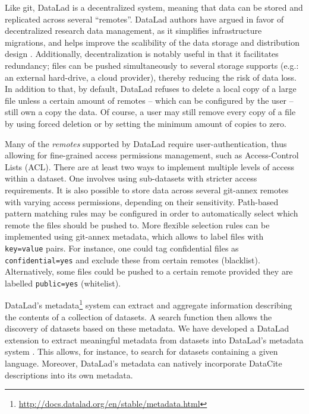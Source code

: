 \documentclass[smallextended]{svjour3}       %
\begin{document}
Like git, DataLad is a decentralized system, meaning that data can be stored and replicated across several ``remotes''. DataLad authors have argued in favor of decentralized research data management, as it simplifies infrastructure migrations, and helps improve the scalibility of the data storage and distribution design \cite{decentralization_hanke}. Additionally, decentralization is notably useful in that it facilitates redundancy; files can be pushed simultaneously to several storage supports (e.g.: an external hard-drive, a cloud provider), thereby reducing the risk of data loss. In addition to that, by default, DataLad refuses to delete a local copy of a large file unless a certain amount of remotes -- which can be configured by the user -- still own a copy the data. Of course, a user may still remove every copy of a file by using forced deletion or by setting the minimum amount of copies to zero.

Many of the \emph{remotes} supported by DataLad require user-authentication, thus allowing for fine-grained access permissions management, such as Access-Control Lists (ACL). There are at least two ways to implement multiple levels of access within a dataset. One involves using sub-datasets with stricter access requirements. It is also possible to store data across several git-annex remotes with varying access permissions, depending on their sensitivity. Path-based pattern matching rules may be configured in order to automatically select which remote the files should be pushed to. More flexible selection rules can be implemented using git-annex metadata, which allows to label files with \texttt{key=value} pairs. For instance, one could tag confidential files as \texttt{confidential=yes} and exclude these from certain remotes (blacklist). Alternatively, some files could be pushed to a certain remote provided they are labelled \texttt{public=yes} (whitelist).

DataLad's metadata\footnote{\url{http://docs.datalad.org/en/stable/metadata.html}} system can extract and aggregate information describing the contents of a collection of datasets. A search function then allows the discovery of datasets based on these metadata. We have developed a DataLad extension to extract meaningful metadata from datasets into DataLad's metadata system \citep{datalad_extension}. This allows, for instance, to search for datasets containing a given language. Moreover, DataLad's metadata can natively incorporate DataCite \citep{brase2009datacite} descriptions into its own metadata.
\end{document}
